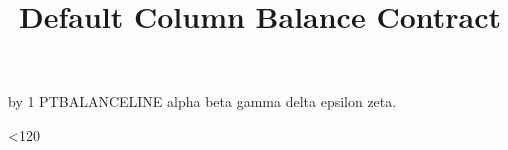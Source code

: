 \documentclass[nominted]{pt-article}
\title{Default Column Balance Contract}
\begin{document}
\makeatletter
{}
\makeatother

\newcount\ptbalanceline
{}
\loop
  \advance\ptbalanceline by 1
  PTBALANCELINE \the\ptbalanceline\quad
  alpha beta gamma delta epsilon zeta.\par
\ifnum\ptbalanceline<120
\repeat
\end{document}
